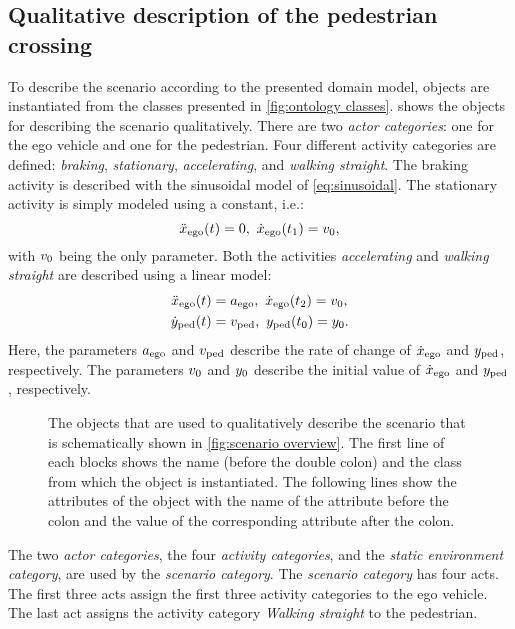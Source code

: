 \subsection{Qualitative description of the pedestrian crossing}
\label{sec:example qualitative}
To describe the scenario according to the presented domain model, objects are instantiated from the classes presented in \cref{fig:ontology classes}.  shows the objects for describing the scenario qualitatively. There are two \textit{actor categories}: one for the ego vehicle and one for the pedestrian. Four different activity categories are defined: \emph{braking}, \emph{stationary}, \emph{accelerating}, and \emph{walking straight}. The braking activity is described with the sinusoidal model of \cref{eq:sinusoidal}. The stationary activity is simply modeled using a constant, i.e.:
\cbstartc
\begin{equation} \label{eq:constant model}
	\ddot{x}_{\mathrm{ego}}(t) = 0,\ \dot{x}_{\mathrm{ego}}(t_{1}) = v_{0},
\end{equation}
with $v_{0}$ being the only parameter.
Both the activities \emph{accelerating} and \emph{walking straight} are described using a linear model:
\begin{align}
	\ddot{x}_{\mathrm{ego}}(t) &= a_{\mathrm{ego}},\ \dot{x}_{\mathrm{ego}}(t_{2}) = v_{0}, \label{eq:ego accelerating} \\
	\dot{y}_{\mathrm{ped}}(t) &= v_{\mathrm{ped}},\ y_{\mathrm{ped}}(t_{0}) = y_{0}. \label{eq:pedestrian walking}
\end{align}
Here, the parameters $a_{\mathrm{ego}}$ and $v_{\mathrm{ped}}$ describe the rate of change of $\dot{x}_{\mathrm{ego}}$ and $y_{\mathrm{ped}}$, respectively. The parameters $v_{0}$ and $y_{0}$ describe the initial value of $\dot{x}_{\mathrm{ego}}$ and $y_{\mathrm{ped}}$, respectively.
\cbend

\begin{figure}
	\centering
	
	\caption{The objects that are used to qualitatively describe the scenario that is schematically shown in \cref{fig:scenario overview}. The first line of each blocks shows the name (before the double colon) and the class from which the object is instantiated. The following lines show the attributes of the object with the name of the attribute before the colon and the value of the corresponding attribute after the colon.}
	\label{fig:example qualitative}
\end{figure}

\cbstart
The two \textit{actor categories}, the four \textit{activity categories}, and the \textit{static environment category}, are used by the \textit{scenario category}. The \textit{scenario category} has four acts. The first three acts assign the first three activity categories to the ego vehicle. The last act assigns the activity category \emph{Walking straight} to the pedestrian.

